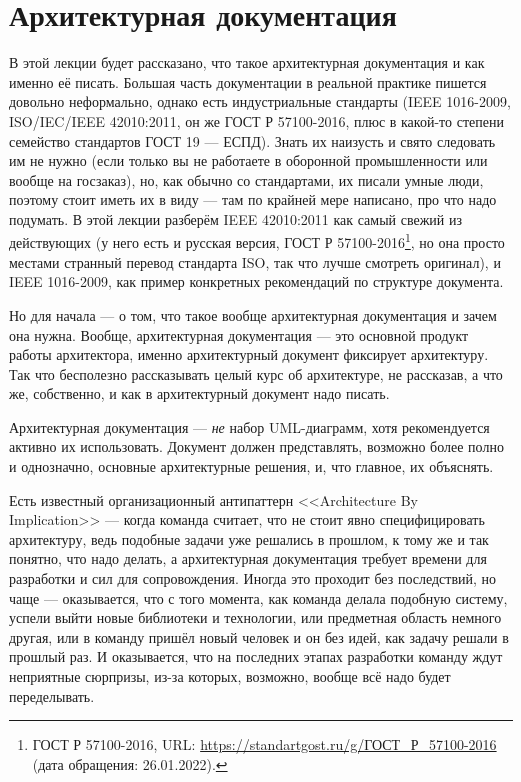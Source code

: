 \documentclass{../mcstext}
\begin{document}
\maketitle
\thispagestyle{empty}

\section{Архитектурная документация}

В этой лекции будет рассказано, что такое архитектурная документация и как именно её писать. Большая часть документации в реальной практике пишется довольно неформально, однако есть индустриальные стандарты (IEEE 1016-2009, ISO/IEC/IEEE 42010:2011, он же ГОСТ Р 57100-2016, плюс в какой-то степени семейство стандартов ГОСТ 19 --- ЕСПД). Знать их наизусть и свято следовать им не нужно (если только вы не работаете в оборонной промышленности или вообще на госзаказ), но, как обычно со стандартами, их писали умные люди, поэтому стоит иметь их в виду --- там по крайней мере написано, про что надо подумать. В этой лекции разберём IEEE 42010:2011 как самый свежий из действующих  (у него есть и русская версия, ГОСТ Р 57100-2016\footnote{ГОСТ Р 57100-2016, URL: \url{https://standartgost.ru/g/ГОСТ_Р_57100-2016} (дата обращения: 26.01.2022).}, но она просто местами странный перевод стандарта ISO, так что лучше смотреть оригинал), и IEEE 1016-2009, как пример конкретных рекомендаций по структуре документа.

Но для начала --- о том, что такое вообще архитектурная документация и зачем она нужна. Вообще, архитектурная документация --- это основной продукт работы архитектора, именно архитектурный документ фиксирует архитектуру. Так что бесполезно рассказывать целый курс об архитектуре, не рассказав, а что же, собственно, и как в архитектурный документ надо писать.

Архитектурная документация --- \emph{не} набор UML-диаграмм, хотя рекомендуется активно их использовать. Документ должен представлять, возможно более полно и однозначно, основные архитектурные решения, и, что главное, их объяснять. 

Есть известный организационный антипаттерн <<Architecture By Implication>> --- когда команда считает, что не стоит явно специфицировать архитектуру, ведь подобные задачи уже решались в прошлом, к тому же и так понятно, что надо делать, а архитектурная документация требует времени для разработки и сил для сопровождения. Иногда это проходит без последствий, но чаще --- оказывается, что с того момента, как команда делала подобную систему, успели выйти новые библиотеки и технологии, или предметная область немного другая, или в команду пришёл новый человек и он без идей, как задачу решали в прошлый раз. И оказывается, что на последних этапах разработки команду ждут неприятные сюрпризы, из-за которых, возможно, вообще всё надо будет переделывать. 
\end{document}
